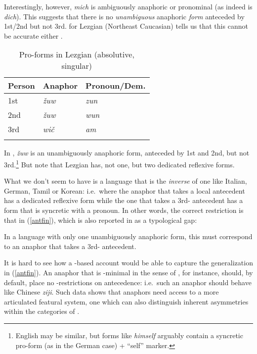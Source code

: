\documentclass[output=paper, modfonts, nonflat]{langsci/langscibook}
\begin{document}
\noindent Interestingly, however, \textit{mich} is ambiguously anaphoric or
pronominal (as indeed is \textit{dich}).  This suggests that there is
no \emph{unambiguous} anaphoric \emph{form} anteceded by 1st/2nd but
not 3rd.  for Lezgian (Northeast Caucasian) tells us
that this cannot be accurate either \citep[][184]{haspelmath:1993}.\largerpage

\begin{table}
	\caption{Pro-forms in Lezgian (absolutive, singular)\label{lez}}
	\begin{tabular}{lll} 
		\lsptoprule
		{Person} & {Anaphor} & {Pronoun/Dem.}\\
		\midrule
		1st & \textit{\v{z}uw} & \textit{zun}\\
		2nd & \textit{\v{z}uw} & \textit{wun}\\
		3rd & \textit{wi\v{c}} & \textit{am}\\
		\lspbottomrule
	\end{tabular}
\end{table}

\noindent In , \textit{\v{z}uw} is an unambiguously anaphoric form,
anteceded by 1st and 2nd, but not 3rd.\footnote{English may be similar,
  but forms like \textit{himself} arguably contain a syncretic
  pro-form (as in the German case) + ``self'' marker.}
But note that Lezgian has, not one, but two dedicated reflexive forms.

\noindent What we don't seem to have is a language that is the \emph{inverse} of
one like Italian, German, Tamil or Korean: i.e.\ where the anaphor
that takes a local antecedent has a dedicated reflexive form while the
one that takes a 3rd-\person{} antecedent has a form that is syncretic
with a pronoun. In other words, the correct restriction is that in
(\ref{antfin}), which is also reported in \citet{comrie:1999} as a
typological gap:

\ea\label{antfin} In a language with only one unambiguously anaphoric
  form, this must correspond to an anaphor that takes a 3rd-\person{}
  antecedent.
\z

\noindent It is hard to see how a \ph-based account would be able to capture the
generalization in (\ref{antfin}). An anaphor that is \ph-minimal in
the sense of \citet{kratzer:2009}, for instance, should, by default,
place no \person-restrictions on antecedence: i.e.\ such an anaphor
should behave like Chinese \textit{ziji}. Such data shows that
anaphors need access to a more articulated featural system, one which
can also distinguish inherent asymmetries within the categories of
\person.
\end{document}
